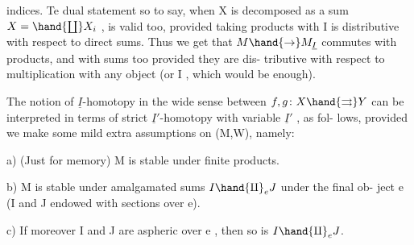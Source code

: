 indices.  Te dual statement so to say,  when X is decomposed as a sum
$X = \hand{\coprod} X_i$ ,  is valid too,  provided taking products with I is distributive
with respect to  direct sums.  Thus we get that $M \hand{\to} M_{\underline{I}}$  commutes with %
   products,  and with   sums too provided they are dis-%
tributive with respect to multiplication with any object  (or  I ,
which would be enough).

The notion of $\underline{I}$-homotopy in the wide sense between $f,g\colon X \hand{\rightrightarrows} Y$ can
be interpreted in terms of strict $\underline{I}'$-homotopy with variable $\underline{I}'$ ,  as fol-%
lows,  provided we make some mild extra assumptions on (M,W), namely:

a)  (Just for memory)  M is stable under finite products.

b)  M is stable under amalgamated sums  $I \hand{\amalg}_e J$  under the final ob-%
ject e (I and J endowed with sections over e).

c)  If moreover I and J are aspheric over e ,  then so is $I \hand{\amalg}_e J$.

